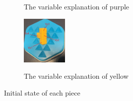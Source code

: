\begin{figure}[htbp]
\begin{subfigure}[b]{.24\textwidth}
\caption{The variable explanation of purple}
  \label{fig:3Dpurple}
\end{subfigure}
\begin{subfigure}[b]{\textwidth}
\centering
\includegraphics[width=0.24\textwidth]{figs/3Dyellow.jpg}\\
\caption{The variable explanation of yellow}
  \label{fig:3Dyellow}
\end{subfigure}
\caption{Initial state of each piece}
  \label{fig:all3Dinit}
\end{figure}
